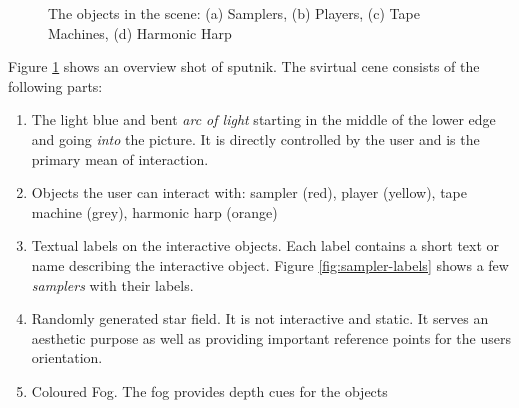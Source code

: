 \documentclass[10pt,a4paper]{scrartcl}
\begin{document}
\begin{figure}[hbtp]
\begin{center}
\caption{The objects in the scene: (a) Samplers, (b) Players, (c) Tape Machines, (d) Harmonic Harp}
\label{fig:screen-shot-overview}
\end{center}
\end{figure}


Figure \ref{fig:screen-shot-overview} shows an overview shot of sputnik. The svirtual cene consists of the following parts:
\begin{enumerate}
\item The light blue and bent \emph{arc of light} starting in the middle of the lower edge and going \emph{into} the picture. It is directly controlled by the user and is the primary mean of interaction.

\item Objects the user can interact with: sampler (red), player (yellow), tape machine (grey), harmonic harp (orange)

\item Textual labels on the interactive objects. Each label contains a short text or name describing the interactive object. Figure \ref{fig:sampler-labels} shows a few \emph{samplers} with their labels.

\item Randomly generated star field. It is not interactive and static. It serves an aesthetic purpose as well as providing important reference points for the users orientation.

\item Coloured Fog. The fog provides depth cues for the objects
\end{enumerate}
\end{document}
